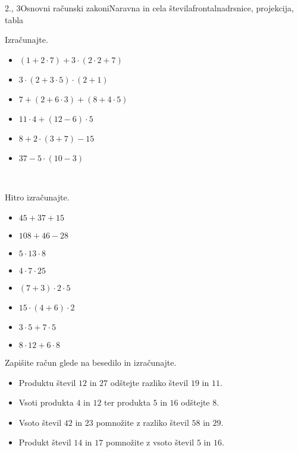 \begin{priprava}{2., 3}{}{Osnovni računski zakoni}{Naravna in cela števila}{frontalna}{drsnice, projekcija, tabla}
\begin{multicols}{2}
    \begin{naloga}
       Izračunajte.
       \begin{itemize}
           \item $(1+2\cdot 7)+3\cdot(2\cdot 2+7)$ 
           \item $3\cdot(2+3\cdot 5)\cdot(2+1)$ 
           \item $7+(2+6\cdot 3)+(8+4\cdot 5)$ 
           \item $11\cdot 4+(12-6)\cdot 5$ 
           \item $8+2\cdot(3+7)-15$ 
           \item $37-5\cdot(10-3)$ 
       \end{itemize}
    \end{naloga}

~

    \begin{naloga}
       Hitro izračunajte.
       \begin{itemize}
           \item $45+37+15$ 
           \item $108+46-28$
           \item $5\cdot 13\cdot 8$
           \item $4\cdot 7\cdot 25$
           \item $(7+3)\cdot 2\cdot 5$
           \item $15\cdot(4+6)\cdot 2$
           \item $3\cdot 5+7\cdot 5$
           \item $8\cdot 12+6\cdot 8$
       \end{itemize}
    \end{naloga}

\end{multicols}

    \begin{naloga}
       Zapišite račun glede na besedilo in izračunajte.
       \begin{itemize}
           \item Produktu števil $12$ in $27$ odštejte razliko števil $19$ in $11$. 
           \item Vsoti produkta $4$ in $12$ ter produkta $5$ in $16$ odštejte $8$. 
           \item Vsoto števil $42$ in $23$ pomnožite z razliko števil $58$ in $29$. 
           \item Produkt števil $14$ in $17$ pomnožite z vsoto števil $5$ in $16$. 
       \end{itemize}
    \end{naloga}




\end{priprava}
